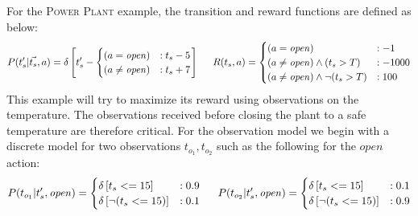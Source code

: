 \documentclass{article} %
\newcommand{\open}{\mathit{open}}
\begin{document}
For the \textsc{Power Plant} example, the transition and reward functions are defined as below:
{\footnotesize
\begin{align}
P(t_s'|\vec{t_s},a)= \delta\left[ t_s' - 
\begin{cases}
 (a=\open) &: t_s - 5 \\ 
(a \neq \open) &: t_s + 7 \\
\end{cases}
\right]\nonumber
\hspace{5mm}
R(t_s,a) = 
\begin{cases}
 (a=\open) &: -1 \\
(a \neq \open)\wedge (t_s>T) &: -1000 \\
(a \neq \open)\wedge \neg(t_s>T) &: 100 \\
\end{cases}\nonumber
\end{align}
}
This example will try to maximize its reward using observations on the temperature. The observations received before closing the plant to a safe temperature are therefore critical.  For the observation model we begin with a discrete model for two observations $t_{o_1},t_{o_2}$ such as the following for the $\open$ action:  
{\footnotesize
\begin{align}
P(t_{o_1}|t_s',\open) = 
\begin{cases}
 \delta\left[ t_s <= 15 \right] &: 0.9 \\
 \delta\left[ \neg (t_s <= 15)\right] &: 0.1 \\
\end{cases}\nonumber
\hspace{5mm}
P(t_{o_2}|t_s',\open) = 
\begin{cases}
 \delta\left[ t_s <= 15 \right] &: 0.1 \\
 \delta\left[ \neg (t_s <= 15)\right] &: 0.9 \\
\end{cases}\nonumber
\end{align}
}
\end{document}
